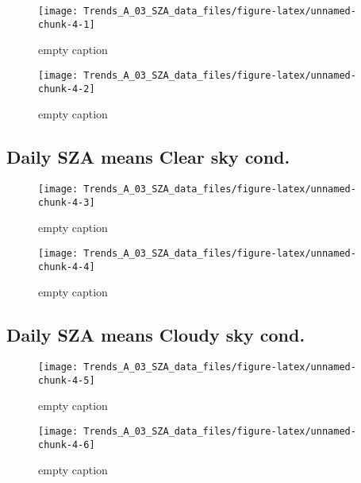 \documentclass[
  10pt,
  a4paper,oneside]{article}
\begin{document}
\begin{figure}[!ht]

{\centering \texttt{[image: Trends\_A\_03\_SZA\_data\_files/figure-latex/unnamed-chunk-4-1]} 

}

\caption{ empty caption }\label{fig:unnamed-chunk-4-1}
\end{figure}
\begin{figure}[!ht]

{\centering \texttt{[image: Trends\_A\_03\_SZA\_data\_files/figure-latex/unnamed-chunk-4-2]} 

}

\caption{ empty caption }\label{fig:unnamed-chunk-4-2}
\end{figure}

\FloatBarrier

\hypertarget{daily-sza-means-clear-sky-cond.}{%
\subsection{Daily SZA means Clear sky cond.}\label{daily-sza-means-clear-sky-cond.}}

\begin{figure}[!ht]

{\centering \texttt{[image: Trends\_A\_03\_SZA\_data\_files/figure-latex/unnamed-chunk-4-3]} 

}

\caption{ empty caption }\label{fig:unnamed-chunk-4-3}
\end{figure}
\begin{figure}[!ht]

{\centering \texttt{[image: Trends\_A\_03\_SZA\_data\_files/figure-latex/unnamed-chunk-4-4]} 

}

\caption{ empty caption }\label{fig:unnamed-chunk-4-4}
\end{figure}

\FloatBarrier

\hypertarget{daily-sza-means-cloudy-sky-cond.}{%
\subsection{Daily SZA means Cloudy sky cond.}\label{daily-sza-means-cloudy-sky-cond.}}

\begin{figure}[!ht]

{\centering \texttt{[image: Trends\_A\_03\_SZA\_data\_files/figure-latex/unnamed-chunk-4-5]} 

}

\caption{ empty caption }\label{fig:unnamed-chunk-4-5}
\end{figure}
\begin{figure}[!ht]

{\centering \texttt{[image: Trends\_A\_03\_SZA\_data\_files/figure-latex/unnamed-chunk-4-6]} 

}

\caption{ empty caption }\label{fig:unnamed-chunk-4-6}
\end{figure}
\end{document}
